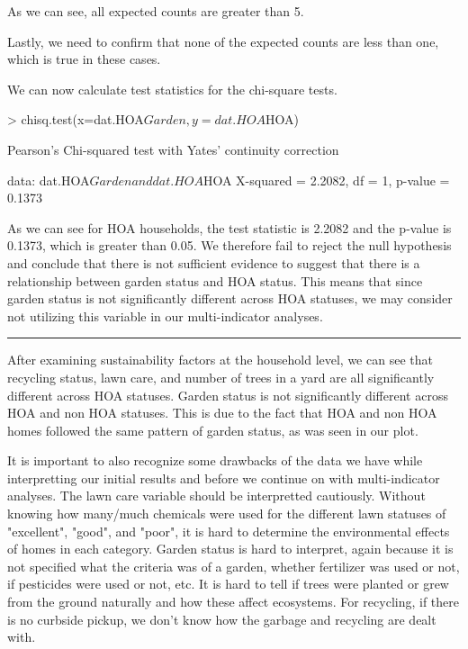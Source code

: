 \documentclass{article}
\begin{document}
As we can see, all expected counts are greater than 5.

Lastly, we need to confirm that none of the expected counts are less than one, which is true in these cases. 

We can now calculate test statistics for the chi-square tests. 
\begin{Schunk}
\begin{Sinput}
> chisq.test(x=dat.HOA$Garden,y=dat.HOA$HOA)
\end{Sinput}
\begin{Soutput}
	Pearson's Chi-squared test with Yates' continuity correction

data:  dat.HOA$Garden and dat.HOA$HOA
X-squared = 2.2082, df = 1, p-value = 0.1373
\end{Soutput}
\end{Schunk}

As we can see for HOA households, the test statistic is 2.2082 and the p-value is 0.1373, which is greater than 0.05. We therefore fail to reject the null hypothesis and conclude that there is not sufficient evidence to suggest that there is a relationship between garden status and HOA status. This means that since garden status is not significantly different across HOA statuses, we may consider not utilizing this variable in our multi-indicator analyses.

\noindent\rule{16cm}{0.4pt}
\newline
After examining sustainability factors at the household level, we can see that recycling status, lawn care, and number of trees in a yard are all significantly different across HOA statuses. Garden status is not significantly different across HOA and non HOA statuses. This is due to the fact that HOA and non HOA homes followed the same pattern of garden status, as was seen in our plot. 

It is important to also recognize some drawbacks of the data we have while interpretting our initial results and before we continue on with multi-indicator analyses. The lawn care variable should be interpretted cautiously. Without knowing how many/much chemicals were used for the different lawn statuses of "excellent", "good", and "poor", it is hard to determine the environmental effects of homes in each category. Garden status is hard to interpret, again because it is not specified what the criteria was of a garden, whether fertilizer was used or not, if pesticides were used or not, etc. It is hard to tell if trees were planted or grew from the ground naturally and how these affect ecosystems. For recycling, if there is no curbside pickup, we don't know how the garbage and recycling are dealt with. 
\end{document}
